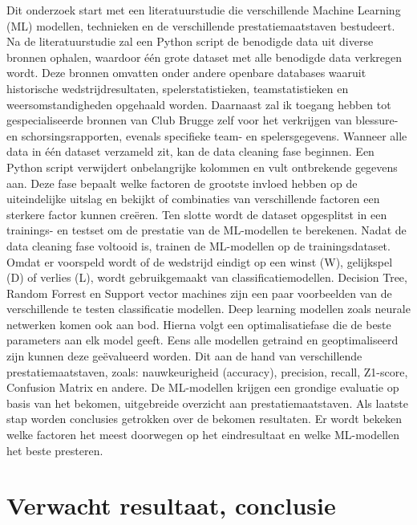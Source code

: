 Dit onderzoek start met een  literatuurstudie die verschillende Machine Learning (ML) modellen, technieken en de verschillende prestatiemaatstaven bestudeert.
Na de literatuurstudie zal een Python script de benodigde data uit diverse bronnen ophalen, waardoor één grote dataset met alle benodigde data verkregen wordt. Deze bronnen omvatten onder andere openbare databases waaruit historische wedstrijdresultaten, spelerstatistieken, teamstatistieken en weersomstandigheden opgehaald worden. Daarnaast zal ik toegang hebben tot gespecialiseerde bronnen van Club Brugge zelf voor het verkrijgen van blessure- en schorsingsrapporten, evenals specifieke team- en spelersgegevens.
Wanneer alle data in één dataset verzameld zit, kan de data cleaning fase beginnen. Een Python script verwijdert onbelangrijke kolommen en vult ontbrekende gegevens aan. Deze fase bepaalt welke factoren de grootste invloed hebben op de uiteindelijke uitslag en bekijkt of combinaties van verschillende factoren een sterkere factor kunnen creëren. Ten slotte wordt de dataset opgesplitst in een trainings- en testset om de prestatie van de ML-modellen te berekenen.
Nadat de data cleaning fase voltooid is, trainen de ML-modellen op de trainingsdataset. Omdat er voorspeld wordt of de wedstrijd eindigt op een winst (W), gelijkspel (D) of verlies (L), wordt gebruikgemaakt van classificatiemodellen. Decision Tree, Random Forrest en Support vector machines zijn een paar voorbeelden van de verschillende te testen classificatie modellen. Deep learning modellen zoals neurale netwerken komen ook aan bod. Hierna volgt een optimalisatiefase die de beste parameters aan elk model geeft. 
Eens alle modellen getraind en geoptimaliseerd zijn kunnen deze geëvalueerd worden. Dit aan de hand van verschillende prestatiemaatstaven, zoals: nauwkeurigheid (accuracy), precision, recall, Z1-score, Confusion Matrix en andere. De ML-modellen krijgen een grondige evaluatie op basis van het bekomen, uitgebreide overzicht aan prestatiemaatstaven. 
Als laatste stap worden conclusies getrokken over de bekomen resultaten. Er wordt bekeken welke factoren het meest doorwegen op het eindresultaat en welke ML-modellen het beste presteren.

\section{Verwacht resultaat, conclusie}%
\label{sec:verwachte_resultaten}

